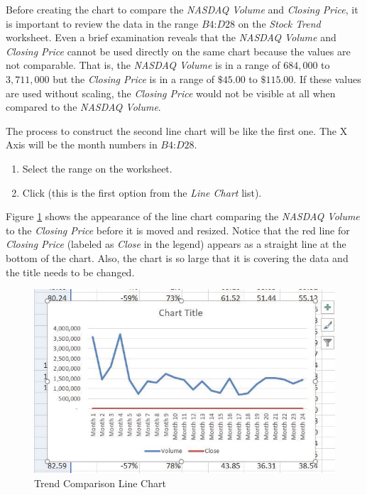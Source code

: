 Before creating the chart to compare the \textit{NASDAQ Volume} and \textit{Closing Price}, it is important to review the data in the range $ B4 $:$ D28 $ on the \textit{Stock Trend} worksheet. Even a brief examination reveals that the \textit{NASDAQ Volume} and \textit{Closing Price} cannot be used directly on the same chart because the values are not comparable. That is, the \textit{NASDAQ Volume} is in a range of $ 684,000 $ to $ 3,711,000 $ but the \textit{Closing Price} is in a range of $ \$45.00 $ to $ \$115.00 $. If these values are used without scaling, the \textit{Closing Price} would not be visible at all when compared to the \textit{NASDAQ Volume}.

The process to construct the second line chart will be like the first one. The X Axis will be the month numbers in $ B4 $:$ D28 $.

\begin{enumbox}
	\begin{enumerate}
		\item Select the range  on the  worksheet.
		\item Click  (this is the first option from the \textit{Line Chart} list).
	\end{enumerate}
\end{enumbox}
	
Figure \ref{04:fig07} shows the appearance of the line chart comparing the \textit{NASDAQ Volume} to the \textit{Closing Price} before it is moved and resized. Notice that the red line for \textit{Closing Price} (labeled as \textit{Close} in the legend) appears as a straight line at the bottom of the chart. Also, the chart is so large that it is covering the data and the title needs to be changed.

\begin{figure}[H]
	\centering
	\includegraphics[width=\maxwidth{.95\linewidth}]{gfx/ch04_fig07}
	\caption{Trend Comparison Line Chart}
	\label{04:fig07}
\end{figure}

